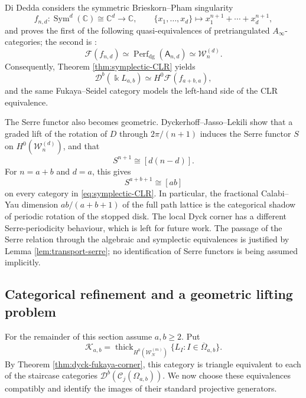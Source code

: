 \documentclass[12pt,a4paper,english,reqno]{amsart}
\theoremstyle{plain}
\theoremstyle{definition}
\newcommand{\kk}{\Bbbk}
\newcommand{\thick}{\operatorname{thick}}
\newcommand{\C}{\mathcal C}
\newcommand{\Wcat}{\mathcal W}
\newcommand{\Fcat}{\mathcal F}
\newcommand{\Db}[1]{{\mathscr D}^b(#1)}
\begin{document}
Di Dedda \cite[Corollary~1.4]{DiDedda} considers the symmetric Brieskorn--Pham
singularity
\begin{equation}
 f_{n,d}:\operatorname{Sym}^{d}(\mathbb C)\cong\mathbb C^d
 \longrightarrow\mathbb C,\qquad
 \{x_1,\ldots,x_d\}\longmapsto
 x_1^{n+1}+\cdots+x_d^{n+1},
\label{eq:symmetric-BP}
\end{equation}
and proves the first of the following quasi-equivalences of pretriangulated
$A_\infty$-categories; the second is \cite[Theorem~1]{DJL}:
\begin{equation}
 \Fcat(f_{n,d})
 \simeq\operatorname{Perf}_{\mathrm{dg}}(\mathsf A_{n,d})
 \simeq\Wcat_n^{(d)}.
\label{eq:DiDedda}
\end{equation}
Consequently, Theorem \ref{thm:symplectic-CLR} yields
\begin{equation}
 \Db{\kk L_{a,b}}
 \simeq H^0\Fcat(f_{a+b,a}),
\label{eq:FS-lattice}
\end{equation}
and the same Fukaya--Seidel category models the left-hand side of the CLR
equivalence.

The Serre functor also becomes geometric.  Dyckerhoff--Jasso--Lekili
\cite[Proposition~2.5.1 and the following remark]{DJL} show
that a graded lift of the rotation of $D$ through
$2\pi/(n+1)$ induces the Serre functor $S$ on
$H^0(\Wcat_n^{(d)})$, and that
\begin{equation}
 S^{n+1}\cong[d(n-d)].
\label{eq:DJL-Serre}
\end{equation}
For $n=a+b$ and $d=a$, this gives
\begin{equation}
 S^{a+b+1}\cong[ab]
\label{eq:lattice-Serre}
\end{equation}
on every category in \eqref{eq:symplectic-CLR}.  In particular, the
fractional Calabi--Yau dimension $ab/(a+b+1)$ of the full path lattice is
the categorical shadow of periodic rotation of the stopped disk.  The
local Dyck corner has a different Serre-periodicity behaviour, which is
left for future work.  The passage of the Serre relation
through the algebraic and symplectic equivalences is justified by
Lemma \ref{lem:transport-serre}; no identification of Serre functors is being
assumed implicitly.

\subsection{Categorical refinement and a geometric lifting problem}

For the remainder of this section assume $a,b\geq2$.  Put
\begin{equation}
 \mathcal K_{a,b}
 =
 \thick_{H^0(\Wcat_N^{(m)})}
 \{L_I:I\in\overline\Omega_{a,b}\}.
\label{eq:dyck-fukaya-subcategory}
\end{equation}
By Theorem \ref{thm:dyck-fukaya-corner}, this category is triangle equivalent to
each of the staircase categories
$\Db{\C_j(\Omega_{a,b})}$.  We now choose these equivalences compatibly
and identify the images of their standard projective generators.
\end{document}

